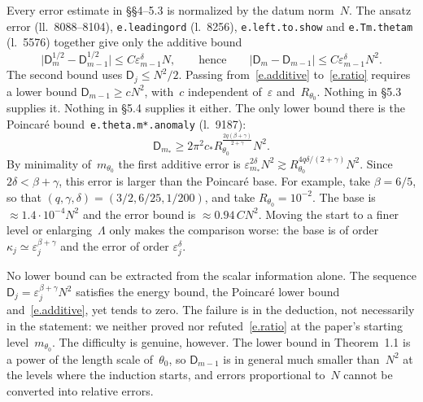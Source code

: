 \documentclass[11pt]{amsart}
\makeatletter
\newcommand{\ep}{\varepsilon}
\newcommand{\Ln}[1]{l.~#1}
\newcommand{\Lns}[1]{ll.~#1}
\newcommand{\lab}[1]{\texttt{#1}}
\newcommand{\nf}[2]{\nicefrac{#1}{#2}}
\providecommand{\nicefrac}[2]{#1/#2}
\renewcommand\paragraph{\@startsection{paragraph}{4}{\z@}{.5\linespacing\@plus.2\linespacing}{-.5em}{\normalfont\bfseries}}
\theoremstyle{remark}
\makeatother
\begin{document}
\paragraph{What fails.}
Every error estimate in \S\S4--5.3 is normalized by the datum norm~$N$. The ansatz error (\Lns{8088--8104}), \lab{e.leadingord} (\Ln{8256}), \lab{e.left.to.show} and \lab{e.Tm.thetam} (\Ln{5576}) together give only the additive bound
\begin{equation}
\label{e.additive}
\bigl|\mathsf D_m^{1/2}-\mathsf D_{m-1}^{1/2}\bigr|\leq C\ep_{m-1}^\delta N ,
\qquad\text{hence}\qquad
|\mathsf D_m-\mathsf D_{m-1}|\leq C\ep_{m-1}^\delta N^2 .
\end{equation}
The second bound uses $\mathsf D_j\leq N^2/2$. Passing from~\eqref{e.additive} to~\eqref{e.ratio} requires a lower bound $\mathsf D_{m-1}\geq cN^2$, with~$c$ independent of~$\ep$ and~$R_{\theta_0}$. Nothing in \S5.3 supplies it. Nothing in \S5.4 supplies it either. The only lower bound there is the Poincaré bound~\lab{e.theta.m*.anomaly} (\Ln{9187}):
\begin{equation*}
\mathsf D_{m_*}\geq 2\pi^2c_*R_{\theta_0}^{\frac{2q(\beta+\gamma)}{2+\gamma}}N^2 .
\end{equation*}
By minimality of~$m_{\theta_0}$ the first additive error is $\ep_{m_*}^{2\delta}N^2\gtrsim R_{\theta_0}^{4q\delta/(2+\gamma)}N^2$. Since $2\delta<\beta+\gamma$, this error is larger than the Poincaré base. For example, take $\beta=\nf65$, so that $(q,\gamma,\delta)=(\nf32,\nf6{25},\nf1{200})$, and take $R_{\theta_0}=10^{-2}$. The base is $\approx1.4\cdot10^{-4}N^2$ and the error bound is $\approx0.94\,C N^2$. Moving the start to a finer level or enlarging~$\Lambda$ only makes the comparison worse: the base is of order $\kappa_j\simeq\ep_j^{\beta+\gamma}$ and the error of order $\ep_j^{\delta}$.

No lower bound can be extracted from the scalar information alone. The sequence $\mathsf D_j=\ep_j^{\beta+\gamma}N^2$ satisfies the energy bound, the Poincaré lower bound and~\eqref{e.additive}, yet tends to zero. The failure is in the deduction, not necessarily in the statement: we neither proved nor refuted~\eqref{e.ratio} at the paper's starting level~$m_{\theta_0}$. The difficulty is genuine, however. The lower bound in Theorem~1.1 is a power of the length scale of~$\theta_0$, so $\mathsf D_{m-1}$ is in general much smaller than~$N^2$ at the levels where the induction starts, and errors proportional to~$N$ cannot be converted into relative errors.
\end{document}
